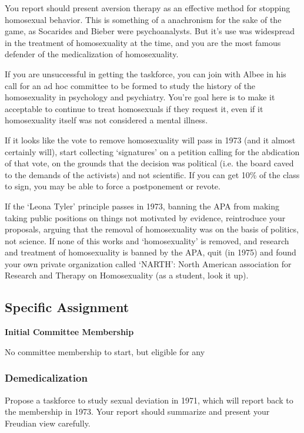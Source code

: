 \begin{refsection}
You report should present aversion therapy as an effective method for stopping homosexual behavior. This is something of a anachronism for the sake of the game, as Socarides and Bieber were psychoanalysts. But it's use was widespread in the treatment of homosexuality at the time, and you are the most famous defender of the medicalization of homosexuality.

If you are unsuccessful in getting the taskforce, you can join with Albee in his call for an ad hoc committee to be formed to study the history of the homosexuality in psychology and psychiatry. You're goal here is to make it acceptable to continue to treat homosexuals if they request it, even if it homosexuality itself was not considered a mental illness.

If it looks like the vote to remove homosexuality will pass in 1973 (and it almost certainly will), start collecting `signatures' on a petition calling for the abdication of that vote, on the grounds that the decision was political (i.e. the board caved to the demands of the activists) and not scientific. If you can get 10\% of the class to sign, you may be able to force a postponement or revote.

If the `Leona Tyler' principle passes in 1973, banning the APA from making taking public positions on things not motivated by evidence, reintroduce your proposals, arguing that the removal of homosexuality was on the basis of politics, not science. If none of this works and `homosexuality' is removed, and research and treatment of homosexuality is banned by the APA, quit (in 1975) and found your own private organization called `NARTH': North American association for Research and Therapy on Homosexuality (as a student, look it up).

\subsection{Specific Assignment}
\label{specificassignment}

\textbf{Initial Committee Membership}

No committee membership to start, but eligible for any

\subsubsection{Demedicalization}
\label{demedicalization}

\begin{proposal}[Bieber]\label{proposal:bieber}Propose a taskforce to study sexual deviation in 1971, which will report back to the membership in 1973. Your report should summarize and present your Freudian view carefully.\end{proposal}


\end{refsection}
